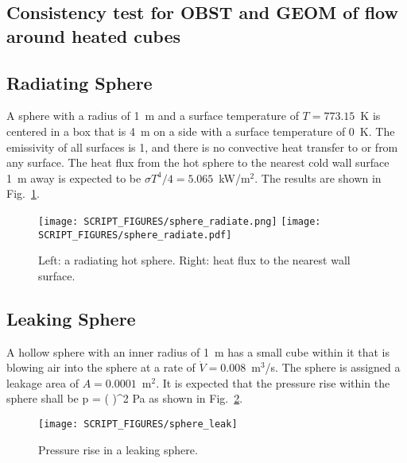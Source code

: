 \documentclass[12pt]{article}
\begin{document}
\subsection{Consistency test for OBST and GEOM of flow around heated cubes}


\subsection{Radiating Sphere}
\label{sphere_radiate}

A sphere with a radius of 1~m and a surface temperature of $T=773.15$~K is centered in a box that is 4~m on a side with a surface temperature of 0~K. The emissivity of all surfaces is 1, and there is no convective heat transfer to or from any surface. The heat flux from the hot sphere to the nearest cold wall surface 1~m away is expected to be $\sigma T^4/4=5.065$~kW/m$^2$. The results are shown in Fig.~\ref{sphere_radiate_fig}.
\begin{figure}[ht]
\texttt{[image: SCRIPT\_FIGURES/sphere\_radiate.png]}
\texttt{[image: SCRIPT\_FIGURES/sphere\_radiate.pdf]}
\caption[The {\ct sphere\_radiate} test case]{Left: a radiating hot sphere. Right: heat flux to the nearest wall surface.}
\label{sphere_radiate_fig}
\end{figure}


\subsection{Leaking Sphere}
\label{sphere_leak}

A hollow sphere with an inner radius of 1~m has a small cube within it that is blowing air into the sphere at a rate of $\dot{V}=0.008$~m$^3$/s. The sphere is assigned a leakage area of $A=0.0001$~m$^2$. It is expected that the pressure rise within the sphere shall be
\be
   \Delta p =  \left(  \right)^2  \; \hbox{Pa}
\ee   
as shown in Fig.~\ref{sphere_leak_fig}.
\begin{figure}[ht]
\centering
\texttt{[image: SCRIPT\_FIGURES/sphere\_leak]}
\caption[The {\ct sphere\_leak} test case]{Pressure rise in a leaking sphere.}
\label{sphere_leak_fig}
\end{figure}

\end{document}
